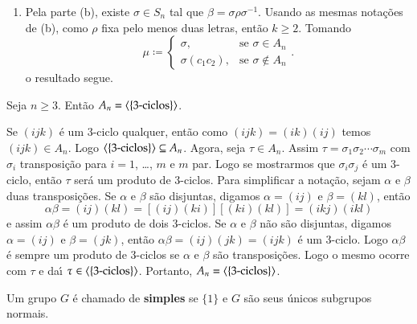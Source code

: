 \begin{prova}
\begin{enumerate}
		\item Pela parte (b), existe $\sigma \in S_n$ tal que $\beta = \sigma\rho\sigma^{-1}$. Usando as mesmas nota\c{c}\~oes de (b), como $\rho$ fixa pelo menos duas letras, ent\~ao $k \ge 2$. Tomando
		\[
			\mu \coloneqq \begin{cases}
				\sigma, & \mbox{se } \sigma \in A_n\\
				\sigma (c_1 c_2), & \mbox{se } \sigma \notin A_n
			\end{cases}.
		\]
		o resultado segue.
	\end{enumerate}
\end{prova}

\begin{proposicao}\label{grupo_alternado_gerado_por_tres_ciclos}
	Seja $n \ge 3$. Ent\~ao $A_n = \langle{\{3\mbox{-ciclos}\}}\rangle$.
\end{proposicao}
\begin{prova}
	Se $(i j k)$ \'e um 3-ciclo qualquer, ent\~ao como $(i j k) = (i k)(i j)$ temos $(i j k) \in A_n$. Logo $\langle{\{3\mbox{-ciclos}\}}\rangle \subseteq A_n$. Agora, seja $\tau \in A_n$. Assim $\tau = \sigma_1\sigma_2 \cdots \sigma_m$ com $\sigma_i$ transposi\c{c}\~ao para $i = 1$, \dots, $m$ e $m$ par. Logo se mostrarmos que $\sigma_i\sigma_j$ \'e um 3-ciclo, ent\~ao $\tau$ ser\'a um produto de 3-ciclos. Para simplificar a nota\c{c}\~ao, sejam $\alpha$ e $\beta$ duas transposi\c{c}\~oes. Se $\alpha$ e $\beta$ s\~ao disjuntas, digamos $\alpha = (i j)$ e $\beta = (k l)$, ent\~ao
	\[
		\alpha\beta = (i j)(k l) = [(i j)(k i)][(k i)(k l)] = (i k j)(i k l)
	\]
	e assim $\alpha\beta$ \'e um produto de dois 3-ciclos. Se $\alpha$ e $\beta$ n\~ao s\~ao disjuntas, digamos $\alpha = (i j)$ e $\beta = (j k)$, ent\~ao $\alpha\beta = (i j)(j k) = (i j k)$ \'e um 3-ciclo. Logo $\alpha\beta$ \'e sempre um produto de 3-ciclos se $\alpha$ e $\beta$ s\~ao transposi\c{c}\~oes. Logo o mesmo ocorre com $\tau$ e da{\'\i} $\tau \in \langle{\{3\mbox{-ciclos}\}}\rangle$. Portanto, $A_n = \langle{\{3\mbox{-ciclos}\}}\rangle$.
\end{prova}

\begin{definicao}
	Um grupo $G$ \'e chamado de \textbf{simples} se $\{1\}$ e $G$ s\~ao seus \'unicos subgrupos normais.
\end{definicao}

